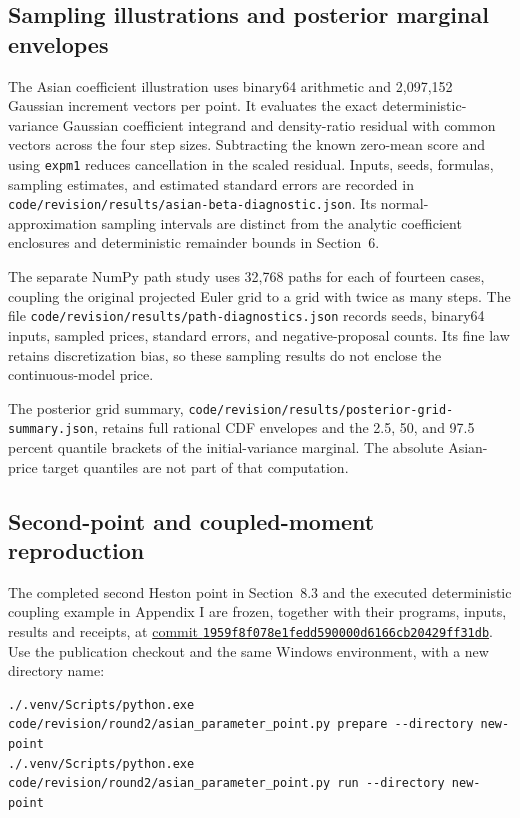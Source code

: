 \documentclass[11pt,a4paper]{article}
\begin{document}
\subsection{Sampling illustrations and posterior marginal envelopes}


The Asian coefficient illustration uses binary64 arithmetic and 2,097,152
Gaussian increment vectors per point. It evaluates the exact
deterministic-variance Gaussian coefficient integrand and density-ratio residual
with common vectors across the four step sizes. Subtracting the known zero-mean
score and using \texttt{expm1} reduces cancellation in the scaled residual.
Inputs, seeds, formulas, sampling estimates, and estimated standard errors
are recorded in \texttt{code/revision/results/asian-beta-diagnostic.json}.
Its normal-approximation sampling intervals are distinct from the analytic
coefficient enclosures and deterministic remainder bounds in Section~6.

The separate NumPy path study uses 32,768 paths for each of fourteen cases,
coupling the original projected Euler grid to a grid with twice as many steps.
The file \texttt{code/revision/results/path-diagnostics.json} records seeds,
binary64 inputs, sampled prices, standard errors, and negative-proposal counts.
Its fine law retains discretization bias, so these sampling results do not
enclose the continuous-model price.

The posterior grid summary,
\texttt{code/revision/results/posterior-grid-summary.json}, retains full rational
CDF envelopes and the 2.5, 50, and 97.5 percent quantile brackets of the
initial-variance marginal. The absolute Asian-price target quantiles are
not part of that computation.


\subsection{Second-point and coupled-moment reproduction}

The completed second Heston point in Section~8.3 and the executed deterministic
coupling example in Appendix I are frozen, together with their programs,
inputs, results and receipts, at
\href{https://github.com/130U/certified-valuation-arithmetic-asian-options/tree/1959f8f078e1fedd590000d6166cb20429ff31db}{commit \texttt{1959f8f078e1fedd590000d6166cb20429ff31db}}.
Use the publication checkout and the same Windows environment, with a new directory name:

\begin{verbatim}
./.venv/Scripts/python.exe code/revision/round2/asian_parameter_point.py prepare --directory new-point
./.venv/Scripts/python.exe code/revision/round2/asian_parameter_point.py run --directory new-point
\end{verbatim}
\end{document}
